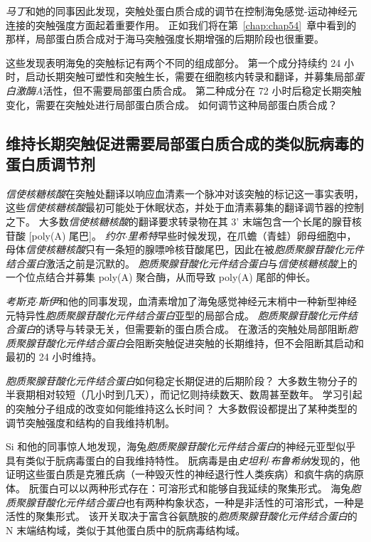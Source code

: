 \textit{马丁}和她的同事因此发现，突触处蛋白质合成的调节在控制海兔感觉-运动神经元连接的突触强度方面起着重要作用。
正如我们将在第~\ref{chap:chap54}~章中看到的那样，局部蛋白质合成对于海马突触强度长期增强的后期阶段也很重要。


这些发现表明海兔的突触标记有两个不同的组成部分。
第一个成分持续约 24 小时，启动长期突触可塑性和突触生长，需要在细胞核内转录和翻译，并募集局部\textit{蛋白激酶A}活性，但不需要局部蛋白质合成。
第二种成分在 72 小时后稳定长期突触变化，需要在突触处进行局部蛋白质合成。
如何调节这种局部蛋白质合成？



\subsection{维持长期突触促进需要局部蛋白质合成的类似朊病毒的蛋白质调节剂}

\textit{信使核糖核酸}在突触处翻译以响应血清素一个脉冲对该突触的标记这一事实表明，这些\textit{信使核糖核酸}最初可能处于休眠状态，并处于血清素募集的翻译调节器的控制之下。
大多数\textit{信使核糖核酸}的翻译要求转录物在其 3' 末端包含一个长尾的腺苷核苷酸 [poly(A) 尾巴]。
\textit{约尔$\cdot$里希特}早些时候发现，在爪蟾（青蛙）卵母细胞中，母体\textit{信使核糖核酸}只有一条短的腺嘌呤核苷酸尾巴，因此在被\textit{胞质聚腺苷酸化元件结合蛋白}激活之前是沉默的。
\textit{胞质聚腺苷酸化元件结合蛋白}与\textit{信使核糖核酸}上的一个位点结合并募集 poly(A) 聚合酶，从而导致 poly(A) 尾部的伸长。


\textit{考斯克$\cdot$斯伊}和他的同事发现，血清素增加了海兔感觉神经元末梢中一种新型神经元特异性\textit{胞质聚腺苷酸化元件结合蛋白}亚型的局部合成。
\textit{胞质聚腺苷酸化元件结合蛋白}的诱导与转录无关，但需要新的蛋白质合成。
在激活的突触处局部阻断\textit{胞质聚腺苷酸化元件结合蛋白}会阻断突触促进突触的长期维持，但不会阻断其启动和最初的 24 小时维持。


\textit{胞质聚腺苷酸化元件结合蛋白}如何稳定长期促进的后期阶段？
大多数生物分子的半衰期相对较短（几小时到几天），而记忆则持续数天、数周甚至数年。
学习引起的突触分子组成的改变如何能维持这么长时间？
大多数假设都提出了某种类型的调节突触强度和结构的自我维持机制。


Si 和他的同事惊人地发现，海兔\textit{胞质聚腺苷酸化元件结合蛋白}的神经元亚型似乎具有类似于朊病毒蛋白的自我维持特性。
朊病毒是由\textit{史坦利$\cdot$布鲁希纳}发现的，他证明这些蛋白质是克雅氏病（一种毁灭性的神经退行性人类疾病）和疯牛病的病原体。
朊蛋白可以以两种形式存在：可溶形式和能够自我延续的聚集形式。
海兔\textit{胞质聚腺苷酸化元件结合蛋白}也有两种构象状态，一种是非活性的可溶形式，一种是活性的聚集形式。
该开关取决于富含谷氨酰胺的\textit{胞质聚腺苷酸化元件结合蛋白}的 N 末端结构域，类似于其他蛋白质中的朊病毒结构域。


